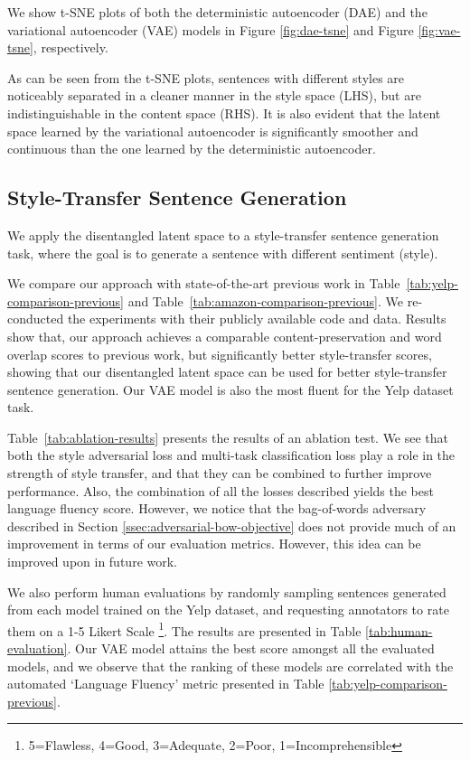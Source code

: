 \documentclass[11pt,a4paper]{article}
\begin{document}
We show t-SNE plots of both the deterministic autoencoder (DAE) and the variational autoencoder (VAE) models in Figure \ref{fig:dae-tsne} and Figure \ref{fig:vae-tsne}, respectively.

As can be seen from the t-SNE plots, sentences with different styles are noticeably separated in a cleaner manner in the style space (LHS), but are indistinguishable in the content space (RHS). It is also evident that the latent space learned by the variational autoencoder is significantly smoother and continuous than the one learned by the deterministic autoencoder.


\subsection{Style-Transfer Sentence Generation}

We apply the disentangled latent space to a style-transfer sentence generation task, where the goal is to generate a sentence with different sentiment (style).

We compare our approach with state-of-the-art previous work in Table~\ref{tab:yelp-comparison-previous} and Table~\ref{tab:amazon-comparison-previous}. We re-conducted the experiments with their publicly available code and data.
Results show that, our approach achieves a comparable content-preservation and word overlap scores to previous work, but significantly better style-transfer scores, showing that our disentangled latent space can be used for better style-transfer sentence generation. Our VAE model is also the most fluent for the Yelp dataset task.

Table~\ref{tab:ablation-results} presents the results of an ablation test. We see that both the style adversarial loss and multi-task classification loss play a role in the strength of style transfer, and that they can be combined to further improve performance. Also, the combination of all the losses described yields the best language fluency score. However, we notice that the bag-of-words adversary described in Section \ref{ssec:adversarial-bow-objective} does not provide much of an improvement in terms of our evaluation metrics. However, this idea can be improved upon in future work.

We also perform human evaluations by randomly sampling sentences generated from each model trained on the Yelp dataset, and requesting annotators to rate them on a 1-5 Likert Scale \citep{likert1932technique} \footnote{5=Flawless, 4=Good, 3=Adequate, 2=Poor, 1=Incomprehensible}. The results are presented in Table \ref{tab:human-evaluation}. Our VAE model attains the best score amongst all the evaluated models, and we observe that the ranking of these models are correlated with the automated `Language Fluency' metric presented in Table \ref{tab:yelp-comparison-previous}.
\end{document}

